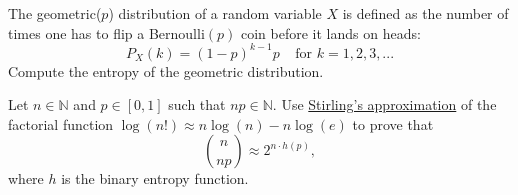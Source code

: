 \documentclass[a4paper,10pt,landscape,twocolumn]{scrartcl}
\begin{document}
\begin{exercise}
The geometric($p$) distribution of a random variable $X$ is defined as the number of times one has to flip a Bernoulli$(p)$ coin before it lands on heads:
\[
P_X(k) = (1-p)^{k-1}p \ \ \ \ \ \mbox{for } k = 1, 2, 3, ...
\]
Compute the entropy of the geometric distribution.
\end{exercise}

\begin{exercise}
Let $n \in \mathbb{N}$ and $p \in [0,1]$ such that $np \in
\mathbb{N}$. Use
\href{https://en.wikipedia.org/wiki/Stirling's_approximation}{Stirling's
  approximation} of the factorial function $\log(n!) \approx n \log(n)
- n \log(e) $ to prove that
\[
{n \choose np} \approx 2^{n \cdot h(p)},
\]
where $h$ is the binary entropy function.
\end{exercise}
\end{document}
